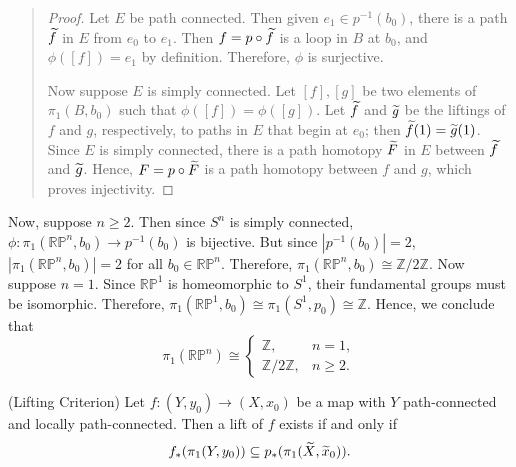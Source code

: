 \documentclass{article}
\begin{document}
\begin{solutions}
\begin{quote}
			\begin{proof}
				Let $E$ be path connected. Then given $e_{1} \in p^{-1}(b_{0})$, there is a path $\widetilde{f}$ in $E$ from $e_{0}$ to $e_{1}$. Then $f = p \circ \widetilde{f}$ is a loop in $B$ at $b_{0}$, and $\phi([f]) = e_{1}$ by definition. Therefore, $\phi$ is surjective. 
				
				Now suppose $E$ is simply connected. Let $[f], [g]$ be two elements of $\pi_{1}(B, b_{0})$ such that $\phi([f]) = \phi([g])$. Let $\widetilde{f}$ and $\widetilde{g}$ be the liftings of $f$ and $g$, respectively, to paths in $E$ that begin at $e_{0}$; then $\widetilde{f}(1) = \widetilde{g}(1)$. Since $E$ is simply connected, there is a path homotopy $\widetilde{F}$ in $E$ between $\widetilde{f}$ and $\widetilde{g}$. Hence, $F = p \circ \widetilde{F}$ is a path homotopy between $f$ and $g$, which proves injectivity. 
			\end{proof}
		\end{quote}
	Now, suppose $n \geq 2$. Then since $S^{n}$ is simply connected, $\phi: \pi_{1}(\mathbb{RP}^{n}, b_{0}) \to p^{-1}(b_{0})$ is bijective. But since $|p^{-1}(b_{0})| = 2$, $|\pi_{1}(\mathbb{RP}^{n},b_{0})| = 2$ for all $b_{0} \in \mathbb{RP}^{n}$. Therefore, $\pi_{1}(\mathbb{RP}^{n},b_{0}) \cong \mathbb{Z}/2\mathbb{Z}$. Now suppose $n = 1$. Since $\mathbb{RP}^{1}$ is homeomorphic to $S^{1}$, their fundamental groups must be isomorphic. Therefore, $\pi_{1}(\mathbb{RP}^{1}, b_{0}) \cong \pi_{1}(S^{1}, p_{0}) \cong \mathbb{Z}$. Hence, we conclude that 
		\begin{equation}
			\pi_{1}(\mathbb{RP}^{n}) \cong 
			\begin{cases}
				\mathbb{Z}, & n = 1, \\
				\mathbb{Z}/2\mathbb{Z}, & n \geq 2. 
			\end{cases}
		\end{equation}
\end{solutions}

\begin{prb}{(Lifting Criterion)}
	Let $f: (Y, y_{0}) \to (X, x_{0})$ be a map with $Y$ path-connected and locally path-connected. Then a lift of $f$ exists if and only if 
		\begin{equation*}
			f_{\ast}(\pi_{1}(Y, y_{0})) \subseteq p_{\ast}(\pi_{1}(\widetilde{X},\widetilde{x}_{0})). 
		\end{equation*}
\end{prb}

\newpage 
\end{document}
